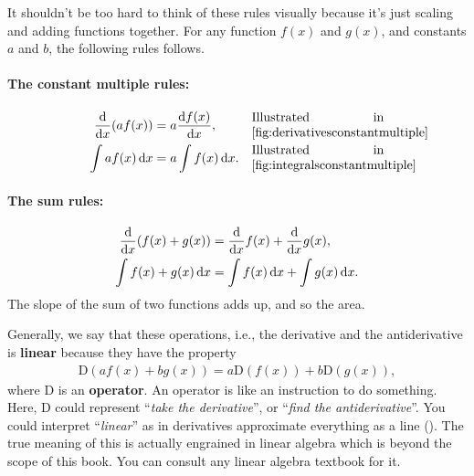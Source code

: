 It shouldn't be too hard to think of these rules visually because it's just scaling and adding functions together. For any function $f(x)$ and $g(x)$, and constants $a$ and $b$, the following rules follows.
\paragraph{The constant multiple rules:}
\begin{align}
    \odv*{(af(x))}{x} &= a\odv{f(x)}{x}, &\alc[0.3]{Illustrated in \cref{fig:derivativesconstantmultiple}}\label{eq:derivativesconstantmultiple} \\
    \int af(x)\odif{x} &= a\int f(x)\odif{x}. &\alc[0.3]{Illustrated in \cref{fig:integralsconstantmultiple}}\label{eq:integralsconstantmultiple}
\end{align}

\paragraph{The sum rules:}
\begin{align}
    \odv*{(f(x) + g(x))}{x} &= \odv*{f(x)}{x} + \odv*{g(x)}{x}, \label{eq:derivativesumrule}\\
    \int f(x) + g(x)\odif{x} &= \int f(x)\odif{x} + \int g(x)\odif{x}. \label{eq:integralssumrule}
\end{align}
The slope of the sum of two functions adds up, and so the area.

Generally, we say that these operations, i.e., the derivative and the antiderivative is \textbf{linear} because they have the property
\begin{gather*}
    \mathrm{D}(af(x) + bg(x)) = a\mathrm{D}(f(x)) + b\mathrm{D}(g(x)),
\end{gather*}
where $\mathrm{D}$ is an \textbf{operator}. An operator is like an instruction to do something. Here, $\mathrm{D}$ could represent ``\emph{take the derivative}'', or ``\emph{find the antiderivative}''. You could interpret ``\emph{linear}'' as in derivatives approximate everything as a line (). The true meaning of this is actually engrained in linear algebra which is beyond the scope of this book. You can consult any linear algebra textbook for it.

